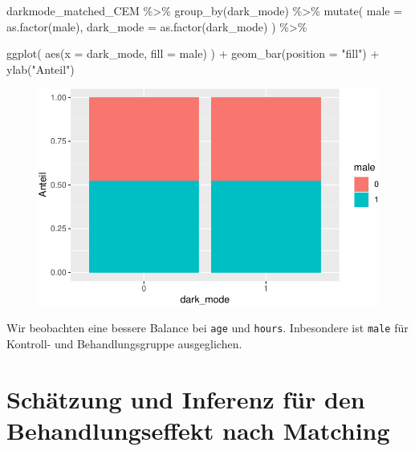 \documentclass[
  a4paper,
  DIV=11,
  oneside]{scrreprt}
\newenvironment{Shaded}{\begin{snugshade}}{\end{snugshade}}
\newcommand{\AttributeTok}[1]{\textcolor[rgb]{0.40,0.45,0.13}{#1}}
\newcommand{\FunctionTok}[1]{\textcolor[rgb]{0.28,0.35,0.67}{#1}}
\newcommand{\NormalTok}[1]{\textcolor[rgb]{0.00,0.23,0.31}{#1}}
\newcommand{\SpecialCharTok}[1]{\textcolor[rgb]{0.37,0.37,0.37}{#1}}
\newcommand{\StringTok}[1]{\textcolor[rgb]{0.13,0.47,0.30}{#1}}
\begin{document}
\begin{Shaded}
\begin{Highlighting}[]
\NormalTok{darkmode\_matched\_CEM }\SpecialCharTok{\%\textgreater{}\%} 
  \FunctionTok{group\_by}\NormalTok{(dark\_mode) }\SpecialCharTok{\%\textgreater{}\%}
  \FunctionTok{mutate}\NormalTok{(}
    \AttributeTok{male =} \FunctionTok{as.factor}\NormalTok{(male), }
    \AttributeTok{dark\_mode =} \FunctionTok{as.factor}\NormalTok{(dark\_mode)}
\NormalTok{  ) }\SpecialCharTok{\%\textgreater{}\%}
  
  \FunctionTok{ggplot}\NormalTok{(}
    \FunctionTok{aes}\NormalTok{(}\AttributeTok{x =}\NormalTok{ dark\_mode, }\AttributeTok{fill =}\NormalTok{ male)}
\NormalTok{  ) }\SpecialCharTok{+}
  \FunctionTok{geom\_bar}\NormalTok{(}\AttributeTok{position =} \StringTok{"fill"}\NormalTok{) }\SpecialCharTok{+}
  \FunctionTok{ylab}\NormalTok{(}\StringTok{"Anteil"}\NormalTok{)}
\end{Highlighting}
\end{Shaded}

\begin{figure}[t]

{\centering \includegraphics{Matching_files/figure-pdf/unnamed-chunk-38-2.pdf}

}

\end{figure}

Wir beobachten eine bessere Balance bei \texttt{age} und \texttt{hours}.
Inbesondere ist \texttt{male} für Kontroll- und Behandlungsgruppe
ausgeglichen.

\hypertarget{schuxe4tzung-und-inferenz-fuxfcr-den-behandlungseffekt-nach-matching}{%
\section{Schätzung und Inferenz für den Behandlungseffekt nach
Matching}\label{schuxe4tzung-und-inferenz-fuxfcr-den-behandlungseffekt-nach-matching}}
\end{document}
